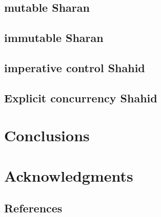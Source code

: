 \documentclass{sig-alternate}
\begin{document}
\subsection{mutable Sharan}
\subsection{immutable Sharan}
\subsection{imperative control Shahid}
\subsection{Explicit concurrency Shahid}

\section{Conclusions}

\section{Acknowledgments}
\subsection{References}
\end{document}
